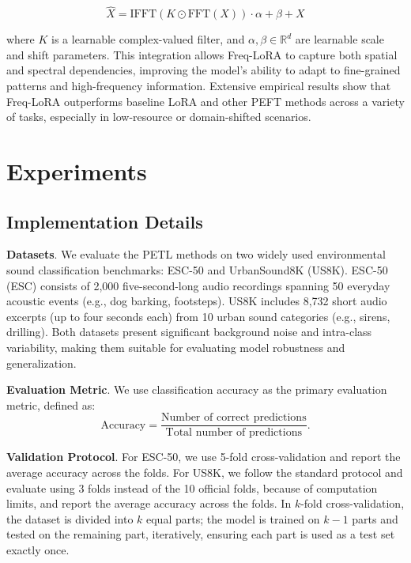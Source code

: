 \documentclass[11pt]{article}
\begin{document}
\begin{equation} \hat{X} = \text{IFFT}(K \odot \text{FFT}(X)) \cdot \alpha + \beta + X \end{equation}

where $K$ is a learnable complex-valued filter, and $\alpha, \beta \in \mathbb{R}^d$ are learnable scale and shift parameters. This integration allows Freq-LoRA to capture both spatial and spectral dependencies, improving the model's ability to adapt to fine-grained patterns and high-frequency information. Extensive empirical results show that Freq-LoRA outperforms baseline LoRA and other PEFT methods across a variety of tasks, especially in low-resource or domain-shifted scenarios.


\section{Experiments}
\subsection{Implementation Details}

\textbf{Datasets}. We evaluate the PETL methods on two widely used environmental sound classification benchmarks: ESC-50 and UrbanSound8K (US8K). ESC-50 (ESC) \cite{piczak2015esc} consists of 2,000 five-second-long audio recordings spanning 50 everyday acoustic events (e.g., dog barking, footsteps). US8K \cite{salamon2014dataset} includes 8,732 short audio excerpts (up to four seconds each) from 10 urban sound categories (e.g., sirens, drilling). Both datasets present significant background noise and intra-class variability, making them suitable for evaluating model robustness and generalization.

\textbf{Evaluation Metric}. We use classification accuracy as the primary evaluation metric, defined as:
\begin{equation}
    \text{Accuracy} = \frac{\text{Number of correct predictions}}{\text{Total number of predictions}}.
\end{equation}

\textbf{Validation Protocol}. For ESC-50, we use 5-fold cross-validation and report the average accuracy across the folds. For US8K, we follow the standard protocol and evaluate using 3 folds instead of the 10 official folds, because of computation limits,  and report the average accuracy across the folds. In $k$-fold cross-validation, the dataset is divided into $k$ equal parts; the model is trained on $k-1$ parts and tested on the remaining part, iteratively, ensuring each part is used as a test set exactly once.
\end{document}
